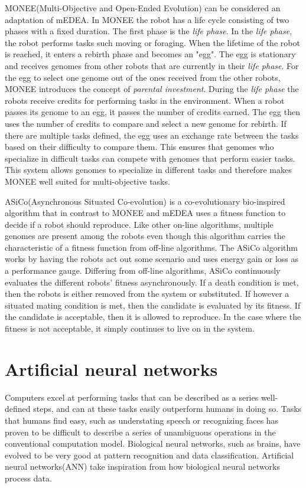 MONEE(Multi-Objective and Open-Ended Evolution) can be considered an adaptation of mEDEA.
In MONEE the robot has a life cycle consisting of two phases with a fixed duration.
The first phase is the \emph{life phase}.
In the \emph{life phase}, the robot performs tasks such moving or foraging.
When the lifetime of the robot is reached, it enters a rebirth phase and becomes an "egg".
The egg is stationary and receives genomes from other robots that are currently in their \emph{life phase}.
For the egg to select one genome out of the ones received from the other robots, MONEE introduces the concept of \emph{parental investment}.
During the \emph{life phase} the robots receive credits for performing tasks in the environment.
When a robot passes its genome to an egg, it passes the number of credits earned.
The egg then uses the number of credits to compare and select a new genome for rebirth.
If there are multiple tasks defined, the egg uses an exchange rate between the tasks based on their difficulty to compare them. 
This ensures that genomes who specialize in difficult tasks can compete with genomes that perform easier tasks. 
This system allows genomes to specialize in different tasks and therefore makes MONEE well suited for multi-objective tasks.

ASiCo(Asynchronous Situated Co-evolution) is a co-evolutionary bio-inspired algorithm that in contrast to MONEE and mEDEA uses a fitness function to decide if a robot should reproduce.
Like other on-line algorithms, multiple genomes are present among the robots even though this algorithm carries the characteristic of a fitness function from off-line algorithms.
The ASiCo algorithm works by having the robots act out some scenario and uses energy gain or loss as a performance gauge. 
Differing from off-line algorithms, ASiCo continuously evaluates the different robots' fitness asynchronously.
If a death condition is met, then the robots is either removed from the system or substituted. 
If however a situated mating condition is met, then the candidate is evaluated by its fitness.
If the candidate is acceptable, then it is allowed to reproduce.
In the case where the fitness is not acceptable, it simply continues to live on in the system.

\section{Artificial neural networks}
Computers excel at performing tasks that can be described as a series well-defined steps, and can at these tasks easily outperform humans in doing so.
Tasks that humans find easy, such as understating speech or recognizing faces has proven to be difficult to describe a series of unambiguous operations in the conventional computation model.
Biological neural networks, such as brains, have evolved to be very good at pattern recognition and data classification.
Artificial neural networks(ANN) take inspiration from how biological neural networks process data.

